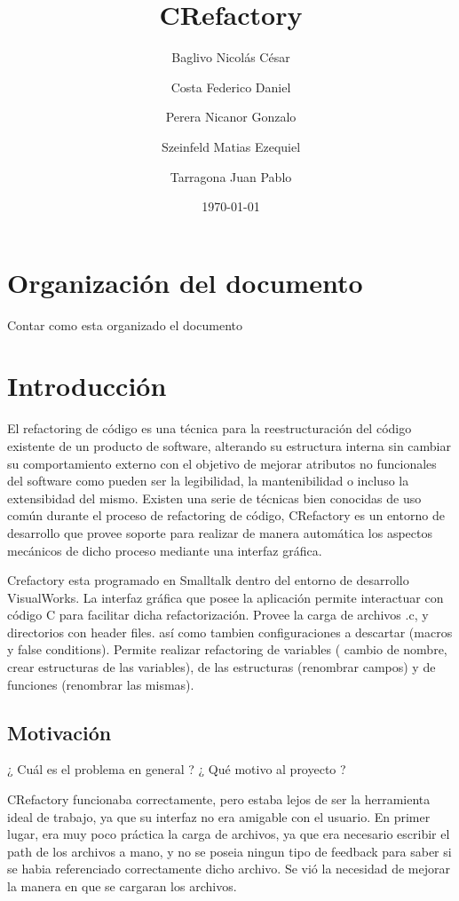 \documentclass[a4paper,oneside,10pt]{article}
\begin{document}

\title{CRefactory}
\author{Baglivo Nicol\'as C\'esar \and Costa Federico Daniel \and Perera Nicanor Gonzalo \and Szeinfeld Matias Ezequiel \and Tarragona Juan Pablo}
\date{\today}
\maketitle

\tableofcontents

\newpage
\section{Organizaci\'on del documento}
Contar como esta organizado el documento

\section{Introducción}
El refactoring de c\'odigo es una técnica para la reestructuración del código existente de un producto de software, alterando su estructura interna sin cambiar su comportamiento externo con el objetivo de mejorar atributos no funcionales del software como pueden ser la legibilidad, la mantenibilidad o incluso la extensibidad del mismo. Existen una serie de t\'ecnicas bien conocidas de uso com\'un durante el proceso de refactoring de c\'odigo, CRefactory es un entorno de desarrollo que provee soporte para realizar de manera autom\'atica los aspectos mec\'anicos de dicho proceso mediante una interfaz gr\'afica.

Crefactory esta programado en Smalltalk dentro del entorno de desarrollo VisualWorks. La interfaz gr\'afica que posee la aplicaci\'on permite interactuar con c\'odigo C para facilitar dicha refactorizaci\'on. Provee la carga de archivos .c, y directorios con header files. as\'i como tambien configuraciones a descartar (macros y false conditions).  
Permite realizar refactoring de variables ( cambio de nombre, crear estructuras de las variables), de las estructuras (renombrar campos) y de funciones (renombrar las mismas).


\subsection{Motivaci\'on}
¿ Cu\'al es el problema en general ? ¿ Qu\'e motivo al proyecto ?

CRefactory funcionaba correctamente, pero estaba lejos de ser la herramienta ideal de trabajo, ya que su interfaz no era amigable con el usuario. En primer lugar, era muy poco pr\'actica la carga de archivos, ya que era necesario escribir el path de los archivos a mano, y no se poseia ningun tipo de feedback para saber si se habia referenciado correctamente dicho archivo. Se vi\'o la necesidad de mejorar la manera en que se cargaran los archivos.
\end{document}
